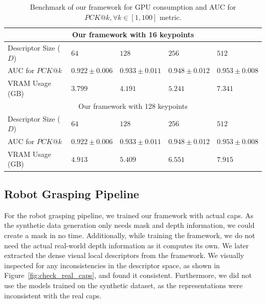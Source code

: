 \begin{table}[htb]
    \caption{Benchmark of our framework for GPU consumption and AUC for $PCK@k,  \forall k \in [1, 100]$ metric.}
    \label{table:framework_training_results}
    \centering
    \begin{tabular}{lllll}
        \toprule
        \multicolumn{5}{c}{Our framework with 16 keypoints}                                                   \\
        \midrule
        Descriptor Size ($D$) & $64 $             & $128 $            & $256 $            & $512$             \\
        AUC for $PCK@k$       & $0.922 \pm 0.006$ & $0.933 \pm 0.011$ & $0.948 \pm 0.012$ & $0.953 \pm 0.008$ \\
        VRAM Usage (GB)       & $3.799 $          & $4.191 $          & $5.241 $          & $7.341$           \\ \hline
        \multicolumn{5}{c}{Our framework with 128 keypoints}                                                  \\
        \midrule
        Descriptor Size ($D$) & $64 $             & $128 $            & $256 $            & $512$             \\
        AUC for $PCK@k$       & $0.922 \pm 0.006$ & $0.933 \pm 0.011$ & $0.948 \pm 0.012$ & $0.953 \pm 0.008$ \\
        VRAM Usage (GB)       & $4.913 $          & $5.409 $          & $6.551$           & $7.915$           \\
        \bottomrule
    \end{tabular}
\end{table}


\subsection{Robot Grasping Pipeline}

For the robot grasping pipeline, we trained our framework with actual caps.
As the synthetic data generation only needs mask and depth information, we could create a mask in no time.
Additionally, while training the framework, we do not need the actual real-world depth information as it computes its own.
We later extracted the dense visual local descriptors from the framework.
We visually inspected for any inconsistencies in the descriptor space, as shown in Figure~\ref{fig:check_real_caps},
and found it consistent. Furthermore, we did not use the models trained on the synthetic dataset, as the representations were inconsistent with the real caps.

